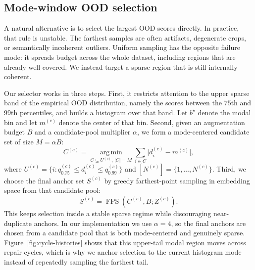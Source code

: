 \documentclass{article}
\begin{document}
\subsection{Mode-window OOD selection}
\label{sec:mode-window}
A natural alternative is to select the largest OOD scores directly. In practice, that rule is unstable. The farthest samples are often artifacts, degenerate crops, or semantically incoherent outliers. Uniform sampling has the opposite failure mode: it spreads budget across the whole dataset, including regions that are already well covered. We instead target a sparse region that is still internally coherent.

Our selector works in three steps. First, it restricts attention to the upper sparse band of the empirical OOD distribution, namely the scores between the $75$th and $99$th percentiles, and builds a histogram over that band. Let $b^{\star}$ denote the modal bin and let $m^{(c)}$ denote the center of that bin. Second, given an augmentation budget $B$ and a candidate-pool multiplier $\alpha$, we form a mode-centered candidate set of size $M = \alpha B$:
\begin{equation}
    C^{(c)} = \operatorname*{arg\,min}_{C \subseteq U^{(c)},\, |C| = M}
    \sum_{i \in C} \bigl| d_i^{(c)} - m^{(c)} \bigr|,
\end{equation}
where $U^{(c)} = \{i : q_{0.75}^{(c)} \le d_i^{(c)} \le q_{0.99}^{(c)}\}$ and $[N^{(c)}] = \{1, \dots, N^{(c)}\}$. Third, we choose the final anchor set $S^{(c)}$ by greedy farthest-point sampling in embedding space from that candidate pool:
\begin{equation}
    S^{(c)} = \operatorname{FPS}\!\left(C^{(c)}, B; Z^{(c)}\right).
\end{equation}
This keeps selection inside a stable sparse regime while discouraging near-duplicate anchors. In our implementation we use $\alpha = 4$, so the final anchors are chosen from a candidate pool that is both mode-centered and genuinely sparse. Figure~\ref{fig:cycle-histories} shows that this upper-tail modal region moves across repair cycles, which is why we anchor selection to the current histogram mode instead of repeatedly sampling the farthest tail.
\end{document}
